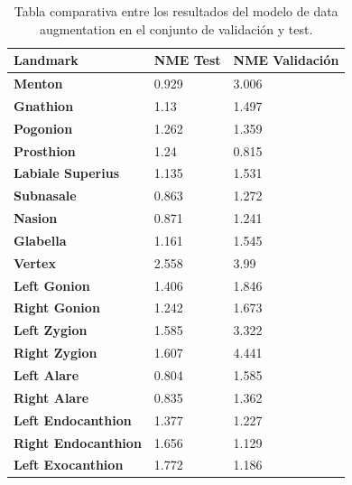         \begin{table}[!ht]
            \centering
            \caption{Tabla comparativa entre los resultados del modelo de data augmentation en el conjunto de validación y test.}
            \begin{tabular}{|l|l|l|}
            \hline
                \cellcolor{gray!25}\textbf{Landmark} & \cellcolor{gray!25}\textbf{NME Test} & \cellcolor{gray!25}\textbf{NME Validación} \\ \hline
                \textbf{Menton} & \cellcolor{green!25}0.929 & 3.006 \\ \hline
                \textbf{Gnathion} & \cellcolor{green!25}1.13 & 1.497 \\ \hline
                \textbf{Pogonion} & \cellcolor{green!25}1.262 & 1.359 \\ \hline
                \textbf{Prosthion} & 1.24 & \cellcolor{green!25}0.815 \\ \hline
                \textbf{Labiale Superius} & \cellcolor{green!25}1.135 & 1.531 \\ \hline
                \textbf{Subnasale} & \cellcolor{green!25}0.863 & 1.272 \\ \hline
                \textbf{Nasion} & \cellcolor{green!25}0.871 & 1.241 \\ \hline
                \textbf{Glabella} & \cellcolor{green!25}1.161 & 1.545 \\ \hline
                \textbf{Vertex} & \cellcolor{green!25}2.558 & 3.99 \\ \hline
                \textbf{Left Gonion} & \cellcolor{green!25}1.406 & 1.846 \\ \hline
                \textbf{Right Gonion} & \cellcolor{green!25}1.242 & 1.673 \\ \hline
                \textbf{Left Zygion} & \cellcolor{green!25}1.585 & 3.322 \\ \hline
                \textbf{Right Zygion} & \cellcolor{green!25}1.607 & 4.441 \\ \hline
                \textbf{Left Alare} & \cellcolor{green!25}0.804 & 1.585 \\ \hline
                \textbf{Right Alare} & \cellcolor{green!25}0.835 & 1.362 \\ \hline
                \textbf{Left Endocanthion} & 1.377 & \cellcolor{green!25}1.227 \\ \hline
                \textbf{Right Endocanthion} & 1.656 & \cellcolor{green!25}1.129 \\ \hline
                \textbf{Left Exocanthion} & 1.772 & \cellcolor{green!25}1.186 \\ \hline

\end{tabular}
\end{table}
